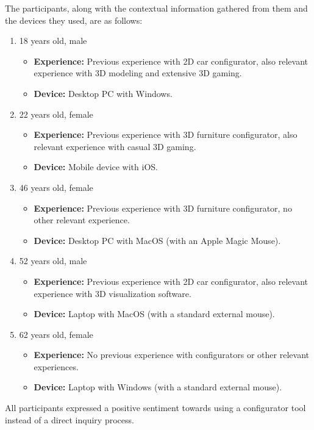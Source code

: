 The participants, along with the contextual information gathered from them and the devices they used, are as follows:
\begin{enumerate}[label=\textbf{Participant \Alph*:}, leftmargin=*, itemindent=6.2em]
    \item 18 years old, male
        \begin{itemize}[noitemsep, label=\trianglebullet]
            \item \textbf{Experience:} Previous experience with 2D car configurator, also relevant experience with 3D modeling and extensive 3D gaming.
            \item \textbf{Device:} Desktop PC with Windows.
        \end{itemize}
        \vspace{4pt}
    \item 22 years old, female
        \begin{itemize}[noitemsep, label=\trianglebullet]
            \item \textbf{Experience:} Previous experience with 3D furniture configurator, also relevant experience with casual 3D gaming.
            \item \textbf{Device:} Mobile device with iOS.
        \end{itemize}
        \vspace{4pt}
    \item 46 years old, female
        \begin{itemize}[noitemsep, label=\trianglebullet]
            \item \textbf{Experience:} Previous experience with 3D furniture configurator, no other relevant experience.
            \item \textbf{Device:} Desktop PC with MacOS (with an Apple Magic Mouse).
        \end{itemize}
        \vspace{4pt}
    \item 52 years old, male
        \begin{itemize}[noitemsep, label=\trianglebullet]
            \item \textbf{Experience:} Previous experience with 2D car configurator, also relevant experience with 3D visualization software.
            \item \textbf{Device:} Laptop with MacOS (with a standard external mouse).
        \end{itemize}
        \vspace{4pt}
    \item 62 years old, female
        \begin{itemize}[noitemsep, label=\trianglebullet]
            \item \textbf{Experience:} No previous experience with configurators or other relevant experiences.
            \item \textbf{Device:} Laptop with Windows (with a standard external mouse).
        \end{itemize}
\end{enumerate}
All participants expressed a positive sentiment towards using a configurator tool instead of a direct inquiry process.

